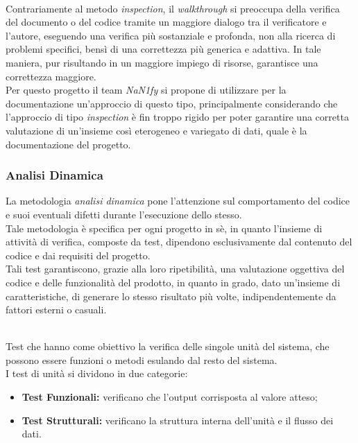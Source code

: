  \\
Contrariamente al metodo \textit{inspection}, il \textit{walkthrough} si preoccupa della verifica del documento o del codice tramite un maggiore dialogo tra il verificatore e l'autore, eseguendo una verifica più sostanziale e profonda, non alla ricerca di problemi specifici, bensì di una correttezza più generica e adattiva. In tale maniera, pur risultando in un maggiore impiego di risorse, garantisce una correttezza maggiore. \\
Per questo progetto il team \textit{NaN1fy} si propone di utilizzare per la documentazione un'approccio di questo tipo, principalmente considerando che l'approccio di tipo \textit{inspection} è fin troppo rigido per poter garantire una corretta valutazione di un'insieme così eterogeneo e variegato di dati, quale è la documentazione del progetto.

\subsubsection{Analisi Dinamica}

La metodologia \textit{analisi dinamica} pone l'attenzione sul comportamento del codice e suoi eventuali difetti durante l'esecuzione dello stesso. \\
Tale metodologia è specifica per ogni progetto in sè, in quanto l'insieme di attività di verifica, composte da test, dipendono esclusivamente dal contenuto del codice e dai requisiti del progetto. \\
Tali test garantiscono, grazie alla loro ripetibilità, una valutazione oggettiva del codice e delle funzionalità del prodotto, in quanto in grado, dato un'insieme di caratteristiche, di generare lo stesso risultato più volte, indipendentemente da fattori esterni o casuali.

 \\
Test che hanno come obiettivo la verifica delle singole unità del sistema, che possono essere funzioni o metodi esulando dal resto del sistema. \\
I test di unità si dividono in due categorie:
\begin{itemize}
    \item \textbf{Test Funzionali:} verificano che l'output corrisposta al valore atteso;
    \item \textbf{Test Strutturali:} verificano la struttura interna dell'unità e il flusso dei dati.
\end{itemize}

